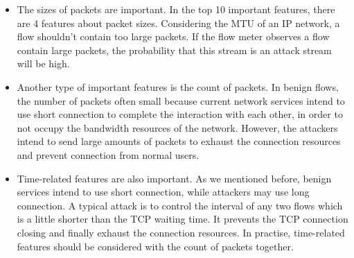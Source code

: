 \documentclass{ieeeaccess}
\theoremstyle{definition}
\begin{document}
\begin{itemize}
	\item The sizes of packets are important. In the top 10 important features, there are 4 features about packet sizes. Considering the MTU of an IP network, a flow shouldn’t contain too large packets. If the flow meter observes a flow contain large packets, the probability that this stream is an attack stream will be high.
    \item Another type of important features is the count of packets. In benign flows, the number of packets often small because current network services intend to use short connection to complete the interaction with each other, in order to not occupy the bandwidth resources of the network. However, the attackers intend to send large amounts of packets to exhaust the connection resources and prevent connection from normal users.
    \item Time-related features are also important. As we mentioned before, benign services intend to use short connection, while attackers may use long connection. A typical attack is to control the interval of any two flows which is a little shorter than the TCP waiting time. It prevents the TCP connection closing and finally exhaust the connection resources. In practise, time-related features should be considered with the count of packets together.
\end{itemize}
\end{document}
